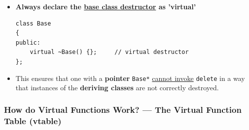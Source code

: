 \documentclass[10pt]{article}
\newcommand{\pbreak}{\vspace{30pt}}
\begin{document}
\pbreak

\begin{tcolorbox}
	\begin{itemize}
		\item \textbf{Always declare the \underline{base class destructor} as 'virtual'}

		\begin{verbatim}
class Base
{
public:
	virtual ~Base() {};		// virtual destructor
};
		\end{verbatim}

	\item This ensures that one with a \textbf{pointer} \verb|Base*| \underline{cannot invoke} \verb|delete| in a way that instances of the \textbf{deriving classes} are not correctly destroyed.
	\end{itemize}
\end{tcolorbox}

\newpage

\subsubsection{How do Virtual Functions Work? --- The Virtual Function Table (vtable)}
\end{document}
